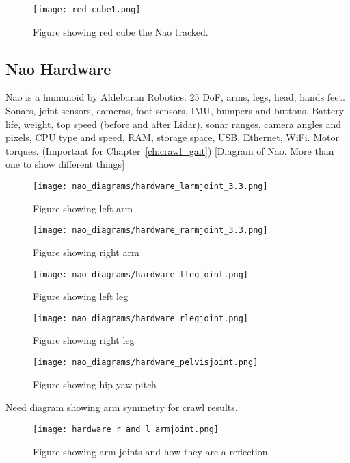 \begin{figure}
\centering
\texttt{[image: red\_cube1.png]}
\caption{Figure showing red cube the Nao tracked.}
\label{fig:nao_arm_joints_reflect1}
\end{figure}

\subsection{Nao Hardware}
Nao is a humanoid by Aldebaran Robotics. 25 DoF, arms, legs, head, hands feet.
Sonars, joint sensors, cameras, foot sensors, IMU, bumpers and buttons.
Battery life, weight, top speed (before and after Lidar), sonar ranges, camera angles and pixels,
CPU type and speed, RAM, storage space, USB, Ethernet, WiFi.
Motor torques. (Important for Chapter~\ref{ch:crawl_gait})
[Diagram of Nao. More than one to show different things]

\begin{figure}
\centering
\texttt{[image: nao\_diagrams/hardware\_larmjoint\_3.3.png]}
\caption{Figure showing left arm}
\label{fig:nao_arm_joints_left1}
\end{figure}

\begin{figure}
\centering
\texttt{[image: nao\_diagrams/hardware\_rarmjoint\_3.3.png]}
\caption{Figure showing right arm}
\label{fig:nao_arm_joints_right1}
\end{figure}

\begin{figure}
\centering
\texttt{[image: nao\_diagrams/hardware\_llegjoint.png]}
\caption{Figure showing left leg}
\label{fig:nao_leg_joints_left1}
\end{figure}

\begin{figure}
\centering
\texttt{[image: nao\_diagrams/hardware\_rlegjoint.png]}
\caption{Figure showing right leg}
\label{fig:nao_leg_joints_right1}
\end{figure}

\begin{figure}
\centering
\texttt{[image: nao\_diagrams/hardware\_pelvisjoint.png]}
\caption{Figure showing hip yaw-pitch}
\label{fig:nao_hip_yawpitch1}
\end{figure}


Need diagram showing arm symmetry for crawl results. 
\begin{figure}
\centering
\texttt{[image: hardware\_r\_and\_l\_armjoint.png]}
\caption{Figure showing arm joints and how they are a reflection.}
\label{fig:nao_arm_joints_reflect1}
\end{figure}

